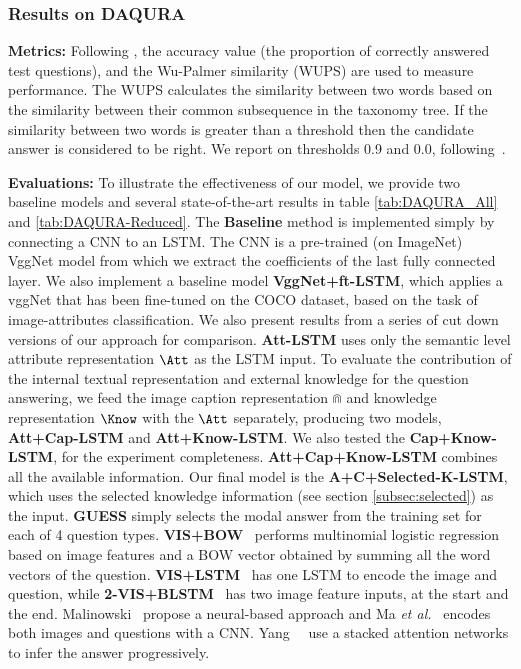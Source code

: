 \subsubsection{Results on DAQURA}
\textbf{Metrics:}
Following \cite{ma2015learning, ren2015image}, the accuracy value (the proportion of correctly answered test questions), and the Wu-Palmer similarity (WUPS) \cite{wu1994verbs} are used to measure performance. The WUPS calculates the similarity between two words based on the similarity between their common subsequence in the taxonomy tree. If the similarity between two words is greater than a threshold then the candidate answer is considered to be right. We report on thresholds 0.9 and 0.0, following~\cite{ma2015learning,ren2015image}.

\vspace{3pt}
\noindent\textbf{Evaluations:}
To illustrate the effectiveness of our model, we provide two baseline models and several state-of-the-art results in table \ref{tab:DAQURA_All} and \ref{tab:DAQURA-Reduced}. The \textbf{Baseline} method is implemented simply by connecting a CNN to an LSTM. The CNN is a pre-trained (on ImageNet) VggNet model from which we extract the coefficients of the last fully connected layer. We also implement a baseline model \textbf{VggNet+ft-LSTM}, which applies a vggNet that has been fine-tuned on the COCO dataset, based on the task of image-attributes classification. We also present results from a series of cut down versions of our approach for comparison. \textbf{Att-LSTM} uses only the semantic level attribute representation $\Att$ as the LSTM input. To evaluate the contribution of the internal textual representation and external knowledge for the question answering, we feed the image caption representation $\Cap$ and knowledge representation $\Know$ with the $\Att$ separately, producing two models, \textbf{Att+Cap-LSTM} and \textbf{Att+Know-LSTM}. We also tested the \textbf{Cap+Know-LSTM}, for the experiment completeness. \textbf{Att+Cap+Know-LSTM} combines all the available information. Our final model is the \textbf{A+C+Selected-K-LSTM}, which uses the selected knowledge information (see section \ref{subsec:selected}) as the input. \textbf{GUESS} \cite{ren2015image} simply selects the modal answer from the training set for each of 4 question types.  %
\textbf{VIS+BOW}~\cite{ren2015image} performs multinomial logistic regression based on image features and a BOW vector obtained by summing all the word vectors of the question. \textbf{VIS+LSTM}~\cite{ren2015image} has one LSTM to encode the image and question, while \textbf{2-VIS+BLSTM}~\cite{ren2015image} has two image feature inputs, at the start and the end. Malinowski\etal~\cite{malinowski2015ask} propose a neural-based approach and Ma \textit{et al.}~\cite{ma2015learning} encodes both images and questions with a CNN. Yang~\etal~\cite{yang2015stacked} use a stacked attention networks to infer the answer progressively.

